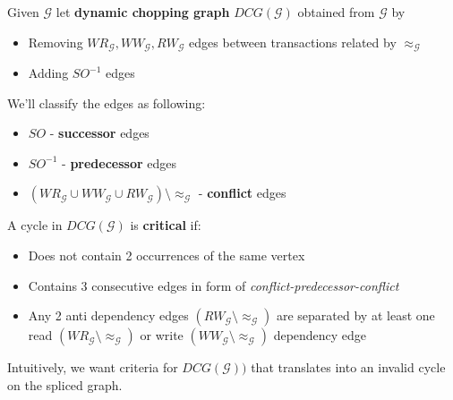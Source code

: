 \documentclass{beamer}
\begin{document}
\begin{frame}
	\begin{definition}
		Given $\mathcal{G}$ let \textbf{dynamic chopping graph} $DCG(\mathcal{G})$ obtained from $\mathcal{G}$ by
		\begin{itemize}
			\item Removing $WR_\mathcal{G}, WW_\mathcal{G}, RW_\mathcal{G}$ edges between transactions related by $\approx_\mathcal{G}$
			\item Adding $SO^{-1}$ edges
		\end{itemize}
		We'll classify the edges as following:
		\begin{itemize}
			\item $SO$ - \textbf{successor} edges
			\item $SO^{-1}$ - \textbf{predecessor} edges
			\item $\left( WR_\mathcal{G} \cup WW_\mathcal{G} \cup RW_\mathcal{G} \right) \setminus \approx_\mathcal{G}$ - \textbf{conflict} edges
		\end{itemize}
	\end{definition}
\end{frame}

\begin{frame}
	\begin{definition}
		A cycle in $DCG(\mathcal{G})$ is \textbf{critical} if:
		\begin{itemize}
			\item Does not contain 2 occurrences of the same vertex 
			\item Contains 3 consecutive edges in form of \textsl{conflict-predecessor-conflict}
			\item Any 2 anti dependency edges $(RW_\mathcal{G}\setminus \approx_\mathcal{G})$ are separated by at least one read $(WR_\mathcal{G}\setminus \approx_\mathcal{G})$ or write $(WW_\mathcal{G}\setminus \approx_\mathcal{G})$ dependency edge
		\end{itemize}
	\end{definition}
	Intuitively, we want criteria for $DCG(\mathcal{G}))$ that translates into an invalid cycle on the spliced graph.
\end{frame}
\end{document}
